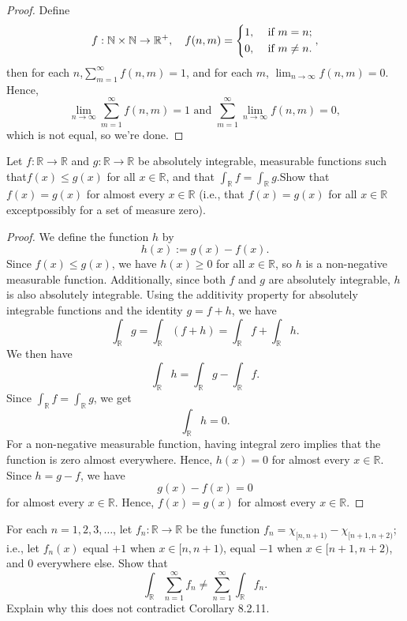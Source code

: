 \begin{proof}
    Define 
    \[
        f: \mathbb{N} \times \mathbb{N} \to \mathbb{R} ^+, \quad f(n, m) = \begin{dcases}
            1, &\text{ if } m = n ;\\
            0, &\text{ if } m \neq n.
        \end{dcases},
    \]
    then for each \(n\),\(\sum_{m=1}^{\infty} f(n, m) = 1 \), and for each \(m\), \(\lim_{n \to \infty} f(n, m) = 0 \). Hence,
    \[
        \lim_{n \to \infty} \sum_{m=1}^{\infty} f(n, m) = 1 \text{ and } \sum_{m=1}^{\infty} \lim_{n \to \infty} f(n, m) = 0,     
    \]    
    which is not equal, so we're done.
\end{proof}

\begin{problem}
    Let $f:\mathbb{R}\to\mathbb{R}$ and $g:\mathbb{R}\to\mathbb{R}$ be absolutely integrable, measurable functions such that$f(x)\le g(x)$ for all $x\in\mathbb{R}$, and that $\int_\mathbb{R} f = \int_\mathbb{R} g$.Show that $f(x)=g(x)$ for almost every $x\in\mathbb{R}$ (i.e., that $f(x)=g(x)$ for all $x\in\mathbb{R}$ exceptpossibly for a set of measure zero).

\end{problem}

\begin{proof}
   We define the function $h$ by
   \[
   h(x) := g(x) - f(x).
   \]
   Since $f(x) \le g(x)$, we have $h(x) \ge 0$ for all $x \in \mathbb{R}$, so $h$ is a non-negative measurable function. Additionally, since both $f$ and $g$ are absolutely integrable, $h$ is also absolutely integrable. Using the additivity property for absolutely integrable functions and the identity $g = f + h$, we have
   \[
   \int_{\mathbb{R}} g = \int_{\mathbb{R}} (f + h) = \int_{\mathbb{R}} f + \int_{\mathbb{R}} h.
   \]
   We then have
   \[
   \int_{\mathbb{R}} h = \int_{\mathbb{R}} g - \int_{\mathbb{R}} f.
   \]
   Since $\int_{\mathbb{R}} f = \int_{\mathbb{R}} g$, we get
   \[
   \int_{\mathbb{R}} h = 0.
   \]
   For a non-negative measurable function, having integral zero implies that the function is zero almost everywhere. Hence, $h(x) = 0$ for almost every $x \in \mathbb{R}$. Since $h=g-f$, we have
   \[
   g(x) - f(x) = 0
   \]
   for almost every $x \in \mathbb{R}$. Hence, $f(x)=g(x)$ for almost every $x \in \mathbb{R}$.
\end{proof}

\begin{problem}
    For each $n=1,2,3,\dots$, let $f_n:\mathbb{R}\to\mathbb{R}$ be the function
$f_n = \chi_{[n,n+1)} - \chi_{[n+1,n+2)}$; i.e., let $f_n(x)$ equal $+1$ when $x\in[n,n+1)$, equal $-1$ when
$x\in[n+1,n+2)$, and $0$ everywhere else. Show that
$$
\int_\mathbb{R}\sum_{n=1}^\infty f_n \ne \sum_{n=1}^\infty \int_\mathbb{R} f_n.
$$
Explain why this does not contradict Corollary 8.2.11.

\end{problem}


